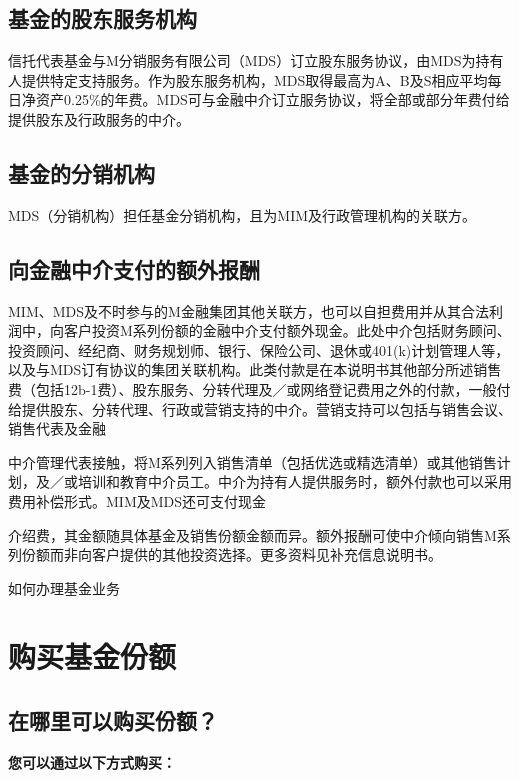 \documentclass[UTF8,fontset=none,11pt,a4paper]{ctexart}
\begin{document}
\subsection*{基金的股东服务机构}
信托代表基金与M分销服务有限公司（MDS）订立股东服务协议，由MDS为持有人提供特定支持服务。作为股东服务机构，MDS取得最高为A、B及S相应平均每日净资产0.25\%的年费。MDS可与金融中介订立服务协议，将全部或部分年费付给提供股东及行政服\allowbreak\mbox{务的中介。}

\subsection*{基金的分销机构}
MDS（分销机构）担任基金分销机构，且为MIM及行政管理机构\allowbreak\mbox{的关联方。}

\subsection*{向金融中介支付的额外报酬}
MIM、MDS及不时参与的M金融集团其他关联方，也可以自担费用并从其合法利润中，向客户投资M系列份额的金融中介支付额外现金。此处中介包括财务顾问、投资顾问、经纪商、财务规划师、银行、保险公司、退休或401(k)计划管理人等，以及与MDS订有协议的集团关联机构。此类付款是在本说明书其他部分所述销售费（包括12b-1费）、股东服务、分转代理及／或网络登记费用之外的付款，一般付给提供股东、分转代理、行政或营销支持的中介。营销支持可以包括与销售会议、销售代\allowbreak\mbox{表及金融}


\par{}\label{originalpage7}
中介管理代表接触，将M系列列入销售清单（包括优选或精选清单）或其他销售计划，及／或培训和教育中介员工。中介为持有人提供服务时，额外付款也可以采用费用补偿形式。MIM及MDS还可\allowbreak\mbox{支付现金}

介绍费，其金额随具体基金及销售份额金额而异。额外报酬可使中介倾向销售M系列份额而非向客户提供的其他投资选择。更多资料见补充信\allowbreak\mbox{息说明书。}


\par{}\label{originalpage8}
如何办理\allowbreak\mbox{基金业务}

\label{unitU312}\section*{购买基金份额}\label{unitU313}
\subsection*{在哪里可以购买份额？}
\textbf{您可以通过以下方式购买：}
\end{document}

